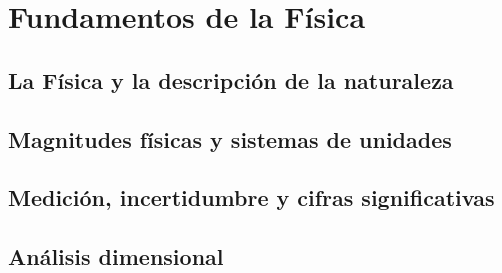 ﻿\documentclass[11pt,letterpaper,openany]{book}
\newcommand{\rutaraiz}{../..}
\begin{document}
\part{Fundamentos de la Física}



\chapter{La Física y la descripción de la naturaleza}





\chapter{Magnitudes físicas y sistemas de unidades}





\chapter{Medición, incertidumbre y cifras significativas}





\chapter{Análisis dimensional}




\end{document}
